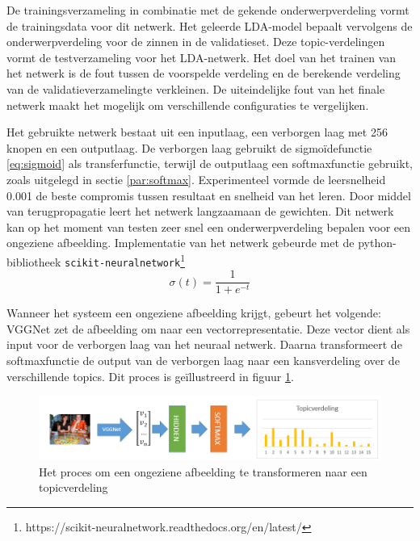 De trainingsverzameling in combinatie met de gekende onderwerpverdeling vormt de trainingsdata voor dit netwerk. 
Het geleerde LDA-model bepaalt vervolgens de onderwerpverdeling voor de zinnen in de validatieset. Deze topic-verdelingen vormt de testverzameling voor het LDA-netwerk. Het doel van het trainen van het netwerk is de fout tussen de voorspelde verdeling en de berekende verdeling van de validatieverzamelingte verkleinen. De uiteindelijke fout van het finale netwerk maakt het mogelijk om verschillende configuraties te vergelijken.

Het gebruikte netwerk bestaat uit een inputlaag, een verborgen laag met 256 knopen en een outputlaag. De verborgen laag gebruikt de sigmo\"idefunctie \eqref{eq:sigmoid} als transferfunctie, terwijl de outputlaag een softmaxfunctie gebruikt, zoals uitgelegd in sectie \ref{par:softmax}. Experimenteel vormde de leersnelheid 0.001 de beste compromis tussen resultaat en snelheid van het leren.
Door middel van terugpropagatie leert het netwerk langzaamaan de gewichten. Dit netwerk kan op het moment van testen zeer snel een onderwerpverdeling bepalen voor een ongeziene afbeelding. Implementatie van het netwerk gebeurde met de python-bibliotheek \texttt{scikit-neuralnetwork}\footnote{https://scikit-neuralnetwork.readthedocs.org/en/latest/}
\begin{equation}
\sigma(t) = \frac{1}{1 + e^{-t}}
\label{eq:sigmoid}
\end{equation}

Wanneer het systeem een ongeziene afbeelding krijgt, gebeurt het volgende: VGGNet zet de afbeelding om naar een vectorrepresentatie. Deze vector dient als input voor de verborgen laag van het neuraal netwerk. Daarna transformeert de softmaxfunctie de output van de verborgen laag naar een kansverdeling over de verschillende topics. Dit proces is ge\"illustreerd in figuur \ref{fig:learningLDA}.


\begin{figure}[tb]
    \centering
    \includegraphics[width=\linewidth]{Images/LDANetwerk.PNG}
    \caption{Het proces om een ongeziene afbeelding te transformeren naar een topicverdeling}
    \label{fig:learningLDA}
\end{figure}

